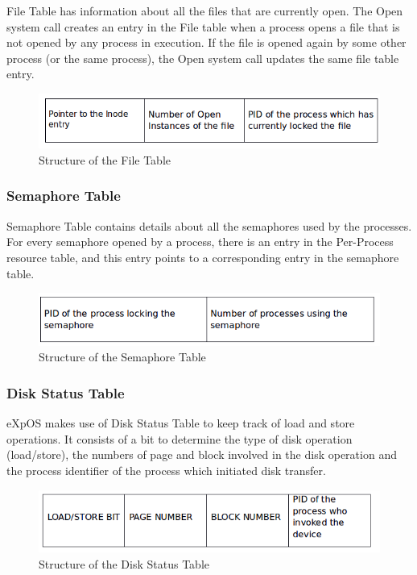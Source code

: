 \documentclass[11pt ,twosided]{article}
\begin{document}
File Table has information about all the files that are currently open.  The Open system call creates an entry in the File table when a process opens a file that is not opened by any process in execution. If the file is opened again by some other process (or the same process), the Open system call updates the same file table entry.
\begin{figure}[ht]
\centering
\includegraphics[scale=0.60]{File_table.png}
\caption{\footnotesize Structure of the File Table}
\label{fig_5}
\end{figure}
\subsubsection{Semaphore Table}

Semaphore Table contains details about all the semaphores used by the processes. For every semaphore opened by a process, there is an entry in the Per-Process resource table,  and this entry points to a corresponding entry in the semaphore table.
\begin{figure}[ht]
\centering
\includegraphics[scale=0.60]{Semaphore_Table.png}
\caption{\footnotesize Structure of the Semaphore Table}
\label{fig_6}
\end{figure}
\subsubsection{Disk Status Table}

eXpOS makes use of Disk Status Table to keep track of load and store operations. It consists of a bit to determine the type of disk operation (load/store), the numbers of page and block involved in the disk operation and the process identifier of the process which initiated disk transfer.
\begin{figure}[ht]
\centering
\includegraphics[scale=0.60]{Disk_Status.png}
\caption{\footnotesize Structure of the Disk Status Table}
\label{fig_7}
\end{figure}
\end{document}
